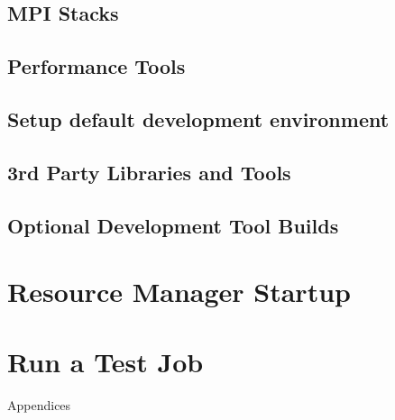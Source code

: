 \documentclass[letterpaper]{article}
\begin{document}
\subsection{MPI Stacks} \label{sec:mpi}


\subsection{Performance Tools} \label{sec:install_perf_tools}


\subsection{Setup default development environment}


\subsection{3rd Party Libraries and Tools} \label{sec:3rdparty}





\vspace*{.6cm}
\subsection{Optional Development Tool Builds} \label{sec:3rdparty_intel}


\section{Resource Manager Startup} \label{sec:rms_startup}


\section{Run a Test Job} \label{sec:test_job}


\clearpage
\appendix
{\bf \LARGE \centerline{Appendices}} \vspace*{0.2cm}

\renewcommand{\thesubsection}{\Alph{subsection}}







\end{document}
